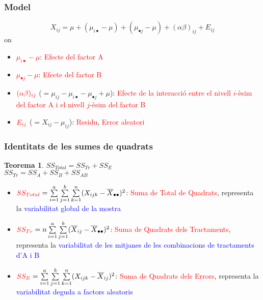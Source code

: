 \documentclass[12pt,t]{beamer}
\newcommand{\red}[1]{\textcolor{red}{#1}}
\newcommand{\blue}[1]{\textcolor{blue}{#1}}
\theoremstyle{plain}
\newtheorem{teorema}{Teorema}
\theoremstyle{definition}
\begin{document}
\begin{frame}
\frametitle{Model}\vspace*{-3ex}


$$
X_{ij} = \mu + (\mu_{i\bullet}-\mu) +(\mu_{\bullet j}-\mu) + (\alpha\beta)_{ij}+E_{ij}
$$
on
\begin{itemize}
\item \red{$\mu_{i\bullet}-\mu$}: \red{Efecte del factor A}\medskip

\item \red{$\mu_{\bullet j}-\mu$}: \red{Efecte del factor B}\medskip

\item $\red{(\alpha\beta)_{ij}}$ ($=\mu_{ij}-\mu_{i\bullet}-\mu_{\bullet j}+\mu$): \red{Efecte de la interacció entre el  nivell $i$-èsim del factor A i el  nivell  $j$-èsim del factor B}
\medskip

\item $\red{E_{ij}}$ ($=X_{ij}-\mu_{ij}$): \red{Residu},  \red{Error aleatori}
\end{itemize}
\end{frame}


\begin{frame}
\frametitle{Identitats de les sumes de quadrats}\vspace*{-2ex} 

\begin{teorema}
$SS_{Total} = SS_{Tr}+SS_E$\\[1ex]
$SS_{Tr} = SS_A+SS_B+SS_{AB}$
\end{teorema}

\begin{itemize}
\item $\red{SS_{Total}} =
\sum\limits_{i=1}^a\sum\limits_{j=1}^b\sum\limits_{k=1}^n
(X_{ijk}-\overline{X}_{\bullet\bullet})^2$: \red{Suma de Total de Quadrats}, representa la \blue{variabilitat global de la mostra} 


\item $\red{SS_{Tr}}=n\sum\limits_{i=1}^a\sum\limits_{j=1}^b
(\overline{X}_{ij}-\overline{X}_{\bullet\bullet})^2$: \red{Suma de Quadrats dels Tractaments}, representa la \blue{variabilitat 
de les mitjanes de les combinacions de tractaments d'A i B}




\item $\red{SS_E} =
\sum\limits_{i=1}^a\sum\limits_{j=1}^b\sum\limits_{k=1}^n
(X_{ijk}-\overline{X}_{ij})^2$: \red{Suma de Quadrats dels  Errors}, representa la \blue{variabilitat  deguda a factors aleatoris}
\end{itemize}

\end{frame}
\end{document}
